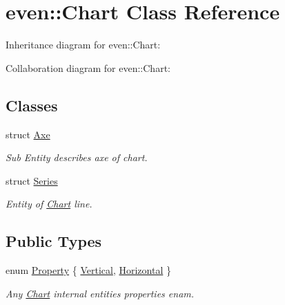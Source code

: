 \hypertarget{classeven_1_1_chart}{}\section{even\+:\+:Chart Class Reference}
\label{classeven_1_1_chart}


Inheritance diagram for even\+:\+:Chart\+:


Collaboration diagram for even\+:\+:Chart\+:
\subsection*{Classes}
\begin{DoxyCompactItemize}
\item 
struct \mbox{\hyperlink{structeven_1_1_chart_1_1_axe}{Axe}}
\begin{DoxyCompactList}\small\item\em Sub Entity describes axe of chart. \end{DoxyCompactList}\item 
struct \mbox{\hyperlink{structeven_1_1_chart_1_1_series}{Series}}
\begin{DoxyCompactList}\small\item\em Entity of \mbox{\hyperlink{classeven_1_1_chart}{Chart}} line. \end{DoxyCompactList}\end{DoxyCompactItemize}
\subsection*{Public Types}
\begin{DoxyCompactItemize}
\item 
enum \mbox{\hyperlink{classeven_1_1_chart_aba4e4fe076d6d3d4682ec5e67ec68b66}{Property}} \{ \mbox{\hyperlink{classeven_1_1_chart_aba4e4fe076d6d3d4682ec5e67ec68b66a3c8cf8da41fbb0ab6643cdccd343b8ee}{Vertical}}, 
\mbox{\hyperlink{classeven_1_1_chart_aba4e4fe076d6d3d4682ec5e67ec68b66afde75bcee70400375cc836e33ccc23d7}{Horizontal}}
 \}
\begin{DoxyCompactList}\small\item\em Any \mbox{\hyperlink{classeven_1_1_chart}{Chart}} internal entities properties enam. \end{DoxyCompactList}\end{DoxyCompactItemize}
